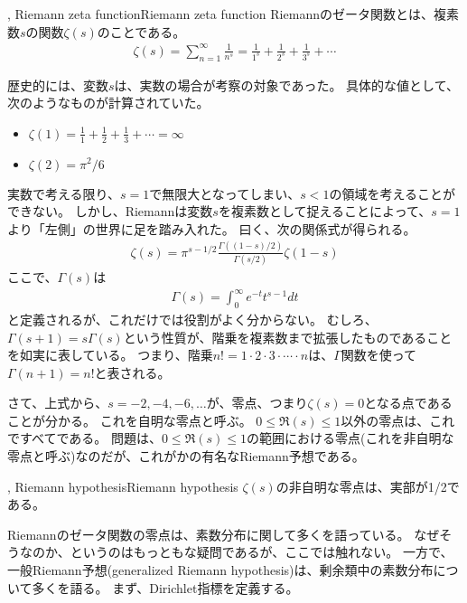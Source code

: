 \begin{Defi}{, Riemann zeta function}{Riemann zeta function}
Riemannのゼータ関数とは、複素数$s$の関数$\zeta(s)$のことである。
\begin{align*}
\zeta(s) = \sum_{n=1}^{\infty} \frac{1}{n^s} = \frac{1}{1^s} + \frac{1}{2^s} + \frac{1}{3^s} + \cdots
\end{align*}
\end{Defi}

歴史的には、変数$s$は、実数の場合が考察の対象であった。
具体的な値として、次のようなものが計算されていた。
\begin{itemize}
\item $\zeta(1) = \frac{1}{1} + \frac{1}{2} + \frac{1}{3} + \cdots = \infty$
\item $\zeta(2) = \pi^2 / 6$
\end{itemize}

実数で考える限り、$s=1$で無限大となってしまい、$s<1$の領域を考えることができない。
しかし、Riemannは変数$s$を複素数として捉えることによって、$s=1$より「左側」の世界に足を踏み入れた。
曰く、次の関係式が得られる。
\begin{align*}
\zeta(s) = \pi^{s-1/2}\frac{\Gamma((1-s)/2)}{\Gamma(s/2)}\zeta(1-s)
\end{align*}
ここで、$\Gamma(s)$は
\begin{align*}
\Gamma(s) = \int_0^{\infty} e^{-t}t^{s-1}dt
\end{align*}
と定義されるが、これだけでは役割がよく分からない。
むしろ、$\Gamma(s+1) = s\Gamma(s)$という性質が、階乗を複素数まで拡張したものであることを如実に表している。
つまり、階乗$n! = 1\cdot2\cdot3\cdot\cdots\cdot{n}$は、$\Gamma$関数を使って$\Gamma(n+1)=n!$と表される。

さて、上式から、$s=-2,-4,-6,\ldots$が、零点、つまり$\zeta(s)=0$となる点であることが分かる。
これを自明な零点と呼ぶ。
$0\le\Re(s)\le1$以外の零点は、これですべてである。
問題は、$0\le\Re(s)\le1$の範囲における零点(これを非自明な零点と呼ぶ)なのだが、これがかの有名なRiemann予想である。

\begin{Conj}{, Riemann hypothesis}{Riemann hypothesis}
$\zeta(s)$の非自明な零点は、実部が1/2である。
\end{Conj}

Riemannのゼータ関数の零点は、素数分布に関して多くを語っている。
なぜそうなのか、というのはもっともな疑問であるが、ここでは触れない。
一方で、一般Riemann予想(generalized Riemann hypothesis)は、剰余類中の素数分布について多くを語る。
まず、Dirichlet指標を定義する。

